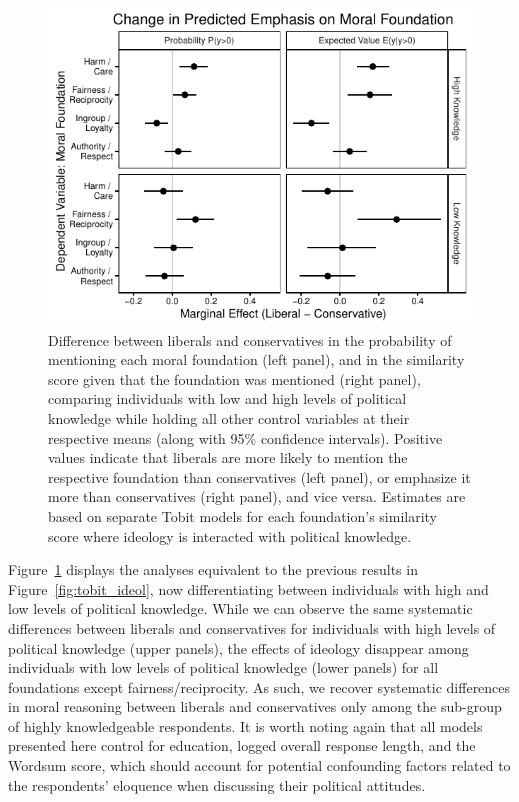 \documentclass[12pt]{article}
\begin{document}
\begin{figure}[ht]\centering
\includegraphics{../calc/fig/tobit_ideol_know.pdf}
\caption{Difference between liberals and conservatives in the probability of mentioning each moral foundation (left panel), and in the similarity score given that the foundation was mentioned (right panel), comparing individuals with low and high levels of political knowledge while holding all other control variables at their respective means (along with 95\% confidence intervals). Positive values indicate that liberals are more likely to mention the respective foundation than conservatives (left panel), or emphasize it more than conservatives (right panel), and vice versa. Estimates are based on separate Tobit models for each foundation's similarity score where ideology is interacted with political knowledge.}\label{fig:tobit_ideol_know}
\end{figure}

Figure~\ref{fig:tobit_ideol_know} displays the analyses equivalent to the previous results in Figure~\ref{fig:tobit_ideol}, now differentiating between individuals with high and low levels of political knowledge. While we can observe the same systematic differences between liberals and conservatives for individuals with high levels of political knowledge (upper panels), the effects of ideology disappear among individuals with low levels of political knowledge (lower panels) for all foundations except fairness/reciprocity. As such, we recover systematic differences in moral reasoning between liberals and conservatives only among the sub-group of highly knowledgeable respondents. It is worth noting again that all models presented here control for education, logged overall response length, and the Wordsum score, which should account for potential confounding factors related to the respondents' eloquence when discussing their political attitudes.
\end{document}
